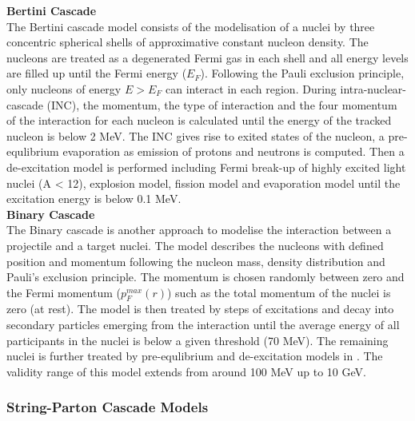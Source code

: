 \textbf{Bertini Cascade}\\

The Bertini cascade model \cite{Heikkinen2003} consists of the modelisation of a nuclei by three concentric spherical shells of approximative constant nucleon density. The nucleons are treated as a degenerated Fermi gas in each shell and all energy levels are filled up until the Fermi energy ($E_F$). Following the Pauli exclusion principle, only nucleons of energy $E > E_F$ can interact in each region. During intra-nuclear-cascade (INC), the momentum, the type of interaction and the four momentum of the interaction for each nucleon is calculated until the energy of the tracked nucleon is below 2 MeV. The INC gives rise to exited states of the nucleon, a pre-equlibrium evaporation as emission of protons and neutrons is computed. Then a de-excitation model is performed including Fermi break-up of highly excited light nuclei (A < 12), explosion model, fission model and evaporation model until the excitation energy is below 0.1 MeV.\\

\textbf{Binary Cascade}\\

The Binary cascade \cite{Folger2004} is another approach to modelise the interaction between a projectile and a target nuclei. The model describes the nucleons with defined position and momentum following the nucleon mass, density distribution and Pauli's exclusion principle. The momentum is chosen randomly between zero and the Fermi momentum ($p_{F}^{max}(r)$) such as the total momentum of the nuclei is zero (at rest). The model is then treated by steps of excitations and decay into secondary particles emerging from the interaction until the average energy of all participants in the nuclei is below a given threshold (70 MeV). The remaining nuclei is further treated by pre-equlibrium and de-excitation models in \geant. The validity range of this model extends from around 100 MeV up to 10 GeV.

\subsubsection{String-Parton Cascade Models}

